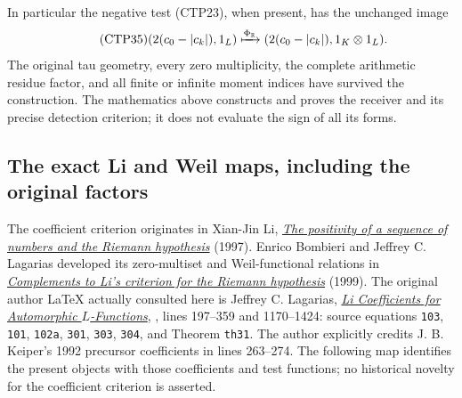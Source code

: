 In particular the negative test (CTP23), when present, has
the unchanged image
\begin{equation}\tag{CTP35}
 (2(c_0-|c_k|),1_L)\xmapsto{\Phi_{\mathbb R}}
       (2(c_0-|c_k|),1_K\otimes1_L).
\end{equation}
The original tau geometry, every zero multiplicity, the complete
arithmetic residue factor, and all finite or infinite moment
indices have survived the construction. The mathematics above
constructs and proves the receiver and its precise detection
criterion; it does not evaluate the sign of all its forms.

\subsection{The exact Li and Weil maps, including the original factors}

The coefficient criterion originates in Xian-Jin Li,
\href{https://doi.org/10.1006/jnth.1997.2137}{\emph{The positivity of
a sequence of numbers and the Riemann hypothesis}} (1997).
Enrico Bombieri and Jeffrey C. Lagarias developed its zero-multiset
and Weil-functional relations in
\href{https://doi.org/10.1006/jnth.1999.2392}{\emph{Complements to
Li's criterion for the Riemann hypothesis}} (1999).
The original author LaTeX actually consulted here is Jeffrey C.
Lagarias, \href{https://arxiv.org/abs/math/0404394v4}{\emph{Li
Coefficients for Automorphic $L$-Functions}},
, lines 197--359 and 1170--1424:
source equations \texttt{103}, \texttt{101}, \texttt{102a},
\texttt{301}, \texttt{303}, \texttt{304}, and Theorem
\texttt{th31}. The author explicitly credits J. B. Keiper's 1992
precursor coefficients in lines 263--274. The following map
identifies the present objects with those coefficients and test
functions; no historical novelty for the coefficient criterion is
asserted.

